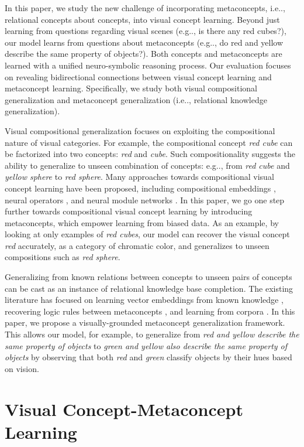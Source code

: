 \documentclass{article}
\makeatletter
\DeclareRobustCommand\onedot{\futurelet\@let@token\@onedot}
\def\@onedot{\ifx\@let@token.\else.\null\fi\xspace}
\def\eg{e.g\onedot} \def\Eg{E.g\onedot}
\def\ie{i.e\onedot} \def\Ie{I.e\onedot}
\makeatother
\begin{document}
In this paper, we study the new challenge of incorporating metaconcepts, \ie, relational concepts about concepts, into visual concept learning. Beyond just learning from questions regarding visual scenes (\eg, is there any red cubes?), our model learns from questions about metaconcepts (\eg, do red and yellow describe the same property of objects?). Both concepts and metaconcepts are learned with a unified neuro-symbolic reasoning process. Our evaluation focuses on revealing bidirectional connections between visual concept learning and metaconcept learning. Specifically, we study both visual compositional generalization and metaconcept generalization (\ie, relational knowledge generalization).

Visual compositional generalization focuses on exploiting the compositional nature of visual categories. For example, the compositional concept {\it red cube} can be factorized into two concepts: {\it red} and {\it cube}. Such compositionality suggests the ability to generalize to unseen combination of concepts: \eg, from {\it red cube} and {\it yellow sphere} to {\it red sphere}. Many approaches towards compositional visual concept learning have been proposed, including compositional embeddings \citep{Misra2017Red}, neural operators \citep{Nagarajan2018Attributes}, and neural module networks \citep{Purushwalkam2019Task}. In this paper, we go one step further towards compositional visual concept learning by introducing metaconcepts, which empower learning from biased data. As an example, by looking at only examples of {\it red cubes}, our model can recover the visual concept {\it red} accurately, as a category of chromatic color, and generalizes to unseen compositions such as {\it red sphere}.

Generalizing from known relations between concepts to unseen pairs of concepts can be cast as an instance of relational knowledge base completion. The existing literature has focused on learning vector embeddings from known knowledge \citep{Socher2013Reasoning,Bordes2013Translating,Wang2014Knowledge}, recovering logic rules between metaconcepts \citep{Yang2017Differentiable}, and learning from corpora \citep{Lin2017Neural}. In this paper, we propose a visually-grounded metaconcept generalization framework. This allows our model, for example, to generalize from {\it red and yellow describe the same property of objects} to {\it green and yellow also describe the same property of objects} by observing that both {\it red} and {\it green} classify objects by their hues based on vision. \section{Visual Concept-Metaconcept Learning}
\end{document}
